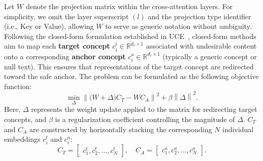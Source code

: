 \documentclass[letterpaper]{article} %
\begin{document}
Let $W$ denote the projection matrix within the cross-attention layers. For simplicity, we omit the layer superscript $(l)$ and the projection type identifier (i.e., Key or Value), allowing $W$ to serve as generic notation without ambiguity. Following the closed-form formulation established in UCE~\cite{UCE}, closed-form methods aim to map each \textbf{target concept} $c^t_{i} \in \mathbb{R}^{d_c \times 1}$ associated with undesirable content onto a corresponding \textbf{anchor concept} $c^a_{i} \in \mathbb{R}^{d_c \times 1}$ (typically a generic concept or null text). This ensures that representations of the target concept are redirected toward the safe anchor. The problem can be formulated as the following objective function:
\begin{equation}
    \min_{\Delta}\left\|\big(W+\Delta\big)C_{T}-WC_{A}\right\|^2
    +\beta\left\|\Delta\right\|^2 .
\end{equation}
Here, $\Delta$ represents the weight update applied to the matrix for redirecting target concepts, and $\beta$ is a regularization coefficient controlling the magnitude of $\Delta$. $C_{T}$ and $C_{A}$ are constructed by horizontally stacking the corresponding $N$ individual embeddings $c^{t}_i$ and $c^{a}_i$:
\begin{equation}
    C_T = \begin{bmatrix} c^{t}_1, c^{t}_2, \dots, c^{t}_N \end{bmatrix}, \quad 
    C_A = \begin{bmatrix} c^{a}_1, c^{a}_2, \dots, c^{a}_N \end{bmatrix} .
\end{equation}
\end{document}
